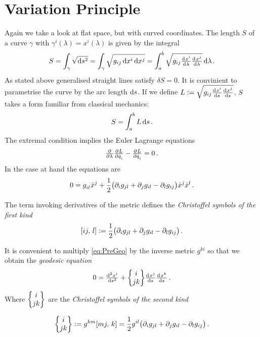 \section{Variation Principle}
Again we take a look at flat space, but with curved coordinates.
The length $S$ of a curve $\gamma$ with $\gamma^i(\lambda) = x^i(\lambda)$ is
given by the integral
\begin{equation}
    S=\int_{\gamma}\sqrt{\dif s^2} =
    \int_{\gamma}\sqrt{g_{ij}\dif x^i\dif x^j}=\int_{a}^{b}\sqrt{g_{ij}\od{x^i}{\lambda} \od{x^j}{\lambda}}\dif \lambda\, .
\end{equation}
As stated above generalised straight lines satisfy $\delta S = 0$. It is
convinient to parametrise the curve by the arc length $\dif s$. If we define
$L:=\sqrt{g_{ij}\od{x^i}{s} \od{x^j}{s}}$, $S$ takes a form
familiar from classical mechanics:
\begin{equation}
    S=\int_a^b L\dif s\, .
\end{equation}
The extremal condition implies the Euler Lagrange equations
\begin{equation}
    \pd{}{\lambda}\pd{L}{\dot{q}_i}-\pd{L}{\dot{q}_i}
=0\, .		\end{equation}
In the case at hand the equations are
\begin{equation}
    0=\tensor{g}{_i_l}\tensor{\ddot{x}}{^j}+\frac{1}{2} \left(\partial_i g_{jl} + \partial_j g_{il} -
    \partial_l g_{ij}\right)\dot{x}^j\dot{x}^l\, . \label{eq:PreGeo}
\end{equation}
\begin{definition}
The term invoking derivatives of the metric defines the \emph{Christoffel
symbols of the first kind}
\begin{equation}
    \csym{i}{j}{l}:=\frac{1}{2} \left(\partial_i g_{jl} + \partial_j g_{il} -
    \partial_l g_{ij}\right)\, .
\end{equation}
\end{definition}
It is convenient to multiply \eqref{eq:PreGeo} by the inverse metric $g^{ki}$ so that we obtain the \emph{geodesic equation}
\begin{equation}
    0 = \od[2]{x^i}{s}+\cSym{i}{j}{k}\od{x^j}{s}\od{x^k}{s}\, .
\end{equation}
Where $\begin{Bmatrix} i \\ j k \end{Bmatrix}$ are the \emph{Christoffel symbols of the second kind}
\begin{definition}
\begin{equation}
    \cSym{i}{j}{k}:=g^{km}\csym{m}{j}{k}=\frac{1}{2}g^{il}\left(\partial_i
    g_{jl} + \partial_j g_{il} - \partial_l g_{ij}\right)\, .
\end{equation}
\end{definition}
